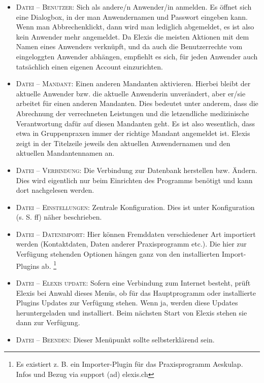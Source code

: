 \begin{itemize}
  \item {\textsc{Datei -- Benutzer}: Sich als andere/n Anwender/in anmelden. Es
  öffnet sich eine Dialogbox, in der man Anwendernamen und Passwort eingeben
  kann. Wenn man \glqq Abbrechen\grqq{}klickt, dann wird man lediglich
  abgemeldet, es ist also kein Anwender mehr angemeldet. Da Elexis die meisten
  Aktionen mit dem Namen eines Anwenders verknüpft, und da auch die
  Benutzerrechte vom eingeloggten Anwender abhängen, empfiehlt es sich, für
  jeden Anwender auch tatsächlich einen eigenen Account einzurichten. }
  \item {\textsc{Datei -- Mandant}: Einen anderen Mandanten aktivieren. Hierbei
  bleibt der aktuelle Anwender bzw. die aktuelle Anwenderin unverändert, aber
  er/sie arbeitet für einen anderen Mandanten. Dies bedeutet unter anderem, dass
  die Abrechnung der verrechneten Leistungen und die letzendliche medizinische
  Verantwortung dafür auf diesen Mandanten geht. Es ist also wesentlich, dass
  etwa in Gruppenpraxen immer der richtige Mandant angemeldet ist. Elexis zeigt
  in der Titelzeile jeweils den aktuellen Anwendernamen und den aktuellen
  Mandantennamen an.}
  \item {\textsc{Datei -- Verbindung}: Die Verbindung zur Datenbank herstellen
  bzw. Ändern. Dies wird eigentlich nur beim Einrichten des Programms benötigt
  und kann dort nachgelesen werden.}
  \item {\textsc{Datei -- Einstellungen}: Zentrale Konfiguration. Dies ist
  unter Konfiguration (s. S. \pageref{settings} ff) näher beschrieben.}
  \item {\textsc{Datei -- Datenimport}: Hier können Fremd\-daten verschie\-de\-ner
  Art impor\-tiert werden (Kontakt\-daten, Da\-ten anderer Praxis\-programm etc.). Die
  hier zur Ver\-fü\-gung ste\-hen\-den Op\-tio\-nen hängen ganz von den instal\-lier\-ten
  Import-Plugins ab.} \footnote{Es existiert z. B. ein Importer-Plugin für das Praxisprogramm Aeskulap. Infos und Bezug via support (ad) elexis.ch}
  \item {\textsc{Datei -- Elexis update}: Sofern eine Verbindung zum Internet
  besteht, prüft Elexis bei Anwahl dieses Menüs, ob für das Hauptprogramm oder
  installierte Plugins Updates zur Verfügung stehen. Wenn ja, werden diese
  Updates heruntergeladen und installiert. Beim nächsten Start von Elexis stehen
  sie dann zur Verfügung.}
  \item {\textsc{Datei -- Beenden}: Dieser Menüpunkt sollte selbsterklärend
  sein.}

\end{itemize}
